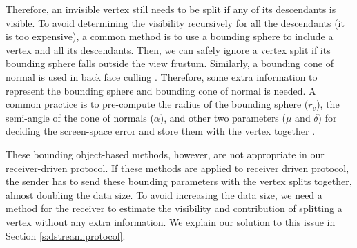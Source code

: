     Therefore, an invisible vertex still needs to be split if any of its descendants is visible. 
    To avoid determining the visibility %
    recursively for all the descendants (it is too expensive), 
    a common method is to use a bounding sphere to include a vertex and all its descendants.
    Then, we can safely ignore a vertex split if its bounding sphere
    falls outside the view frustum.
    Similarly, a bounding cone of normal is used in back face culling \cite{258843}.
    Therefore, some extra information to represent the bounding sphere
    and bounding cone of normal is needed. A common practice is to
    pre-compute the radius of the bounding sphere ($r_v$), the semi-angle of
    the cone of normals ($\alpha$), and other two parameters
    ($\mu$ and $\delta$) for deciding the screen-space error
    and store them with the vertex together \cite{258843, kim:view}.
    
    These bounding object-based methods, however, are not appropriate
    in our receiver-driven protocol. 
    If these methods are applied to receiver driven protocol, the sender has to send
    these bounding parameters with the vertex splits together, almost doubling 
    the data size. 
    To avoid increasing the data size, 
    we need a method for the receiver to estimate the visibility and contribution of 
    splitting a vertex without any extra information.
    We explain our solution to this issue in Section \ref{s:dstream:protocol}.

